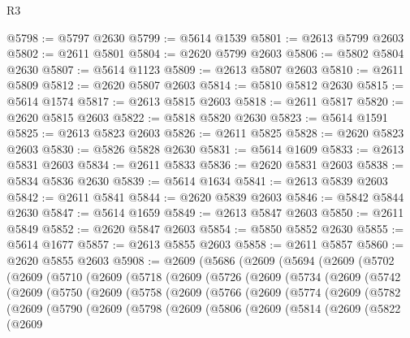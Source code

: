 \begin{lexlean}{R3}
\begin{coremodule}
@5798 := @5797 @2630
@5799 := @5614 @1539
@5801 := @2613 @5799 @2603
@5802 := @2611 @5801
@5804 := @2620 @5799 @2603
@5806 := @5802 @5804 @2630
@5807 := @5614 @1123
@5809 := @2613 @5807 @2603
@5810 := @2611 @5809
@5812 := @2620 @5807 @2603
@5814 := @5810 @5812 @2630
@5815 := @5614 @1574
@5817 := @2613 @5815 @2603
@5818 := @2611 @5817
@5820 := @2620 @5815 @2603
@5822 := @5818 @5820 @2630
@5823 := @5614 @1591
@5825 := @2613 @5823 @2603
@5826 := @2611 @5825
@5828 := @2620 @5823 @2603
@5830 := @5826 @5828 @2630
@5831 := @5614 @1609
@5833 := @2613 @5831 @2603
@5834 := @2611 @5833
@5836 := @2620 @5831 @2603
@5838 := @5834 @5836 @2630
@5839 := @5614 @1634
@5841 := @2613 @5839 @2603
@5842 := @2611 @5841
@5844 := @2620 @5839 @2603
@5846 := @5842 @5844 @2630
@5847 := @5614 @1659
@5849 := @2613 @5847 @2603
@5850 := @2611 @5849
@5852 := @2620 @5847 @2603
@5854 := @5850 @5852 @2630
@5855 := @5614 @1677
@5857 := @2613 @5855 @2603
@5858 := @2611 @5857
@5860 := @2620 @5855 @2603
@5908 := @2609
    (@5686
      (@2609
        (@5694
          (@2609
            (@5702
              (@2609
                (@5710
                  (@2609
                    (@5718
                      (@2609
                        (@5726
                          (@2609
                            (@5734
                              (@2609
                                (@5742
                                  (@2609
                                    (@5750
                                      (@2609
                                        (@5758
                                          (@2609
                                            (@5766
                                              (@2609
                                                (@5774
                                                  (@2609
                                                    (@5782
                                                      (@2609
                                                        (@5790
                                                          (@2609
                                                            (@5798
                                                              (@2609
                                                                (@5806
                                                                  (@2609
                                                                    (@5814
                                                                      (@2609
                                                                        (@5822
                                                                          (@2609

\end{coremodule}
\end{lexlean}
